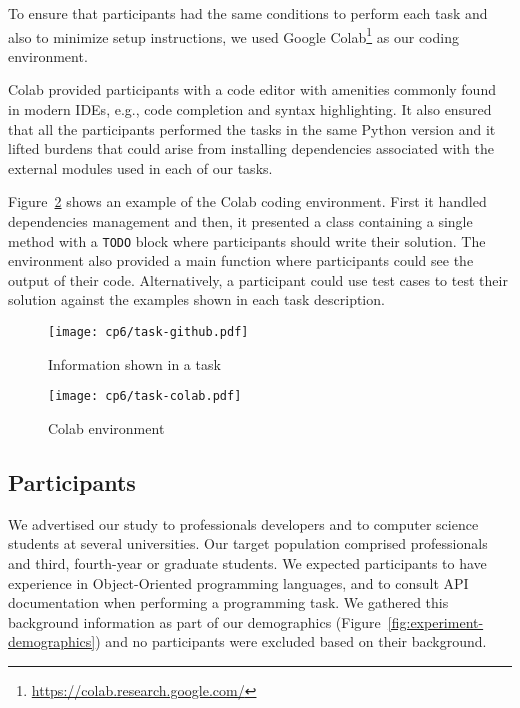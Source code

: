 To ensure that participants had the same conditions to perform each task
and also to minimize setup instructions, we used Google Colab\footnote{\url{https://colab.research.google.com/}} as our coding environment. 


Colab provided participants with a code editor with amenities commonly found in modern IDEs, e.g., code completion and syntax highlighting. It also ensured that all the participants 
performed the tasks in the same Python version and it lifted 
burdens that could arise from installing dependencies associated with the external modules used in each of our tasks. 


Figure~\ref{fig:nytimes-task-colab} shows an example of the Colab coding environment. 
First it handled dependencies management and then, 
it presented a class containing a single method with a \texttt{TODO} block where 
participants should write their solution. 
The environment also provided a main function where participants could see the output
of their code. Alternatively, a participant could use test cases to test their solution
against the examples shown in each task description.



\clearpage

\begin{figure}
    \centering
    \texttt{[image: cp6/task-github.pdf]}
    \caption{Information shown in a task}
    \label{fig:nytimes-task-github}
\end{figure}



\clearpage

\begin{figure}
    \centering
    \texttt{[image: cp6/task-colab.pdf]}
    \caption{Colab environment}
    \label{fig:nytimes-task-colab}
\end{figure}



\clearpage



\subsection{Participants}
\label{cp6:participants}


We advertised our study to professionals developers and to computer science students at  several universities. 
Our target population comprised professionals and third, fourth-year or graduate students.
We expected participants to have experience in Object-Oriented programming languages, and to consult API documentation when performing a programming task.
We gathered this background information as part of our demographics (Figure~\ref{fig:experiment-demographics})
and no participants were excluded
based on their background.

